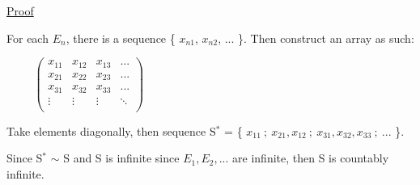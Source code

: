 	{ \color{magenta} \underline{Proof} } 
	
		For each $E_n$, there is a sequence \{ $x_{n1}$, $x_{n2}$, ... \}.
		Then construct an array as such:

		$ \hspace{1cm}
		\left(
		\begin{array}{cccc}
			x_{11} & x_{12} & x_{13} & ... \\
			x_{21} & x_{22} & x_{23} & ... \\
			x_{31} & x_{32} & x_{33} & ... \\
			\vdots & \vdots & \vdots & \ddots \\
		\end{array}
		\right)
		$
		
		Take elements diagonally, then sequence S$^*$ =
		\{ $x_{11} \ ; \ x_{21}, x_{12} \ ; \ x_{31}, x_{32}, x_{33} \ ; \ ... $ \}.
		
		\begin{adjustbox}{minipage=15cm, right}
			Since S$^*$ $\sim$ S and S is infinite since $E_1, E_2, ...$ are infinite,
			then S is countably infinite.
		\end{adjustbox}


































